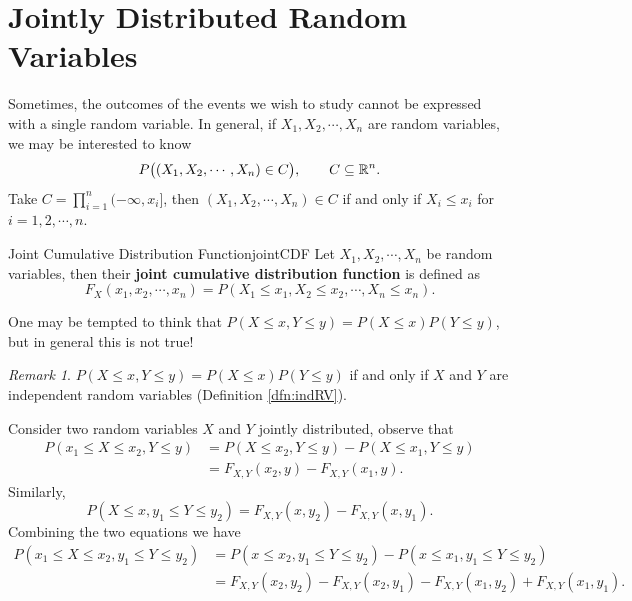 \documentclass[math]{amznotes}
\theoremstyle{remark}
\newtheorem*{remark}{Remark}
\newcommand{\0}{\mathbf{0}}
\newcommand{\1}{\mathbf{1}}
\begin{document}
\section{Jointly Distributed Random Variables}
Sometimes, the outcomes of the events we wish to study cannot be expressed with a single random variable. In general, if $X_1, X_2, \cdots, X_n$ are random variables, we may be interested to know
\begin{equation*}
    P\bigl((X_1, X_2, \cdots, X_n) \in C\bigr), \qquad C \subseteq \mathbb{R}^n.
\end{equation*}
Take $C = \prod_{i = 1}^{n}(-\infty, x_i]$, then $(X_1, X_2, \cdots, X_n) \in C$ if and only if $X_i \leq x_i$ for $i = 1, 2, \cdots, n$. 
\begin{dfnbox}{Joint Cumulative Distribution Function}{jointCDF}
    Let $X_1, X_2, \cdots, X_n$ be random variables, then their {\color{red} \textbf{joint cumulative distribution function}} is defined as
    \begin{equation*}
        F_{X}(x_1, x_2, \cdots, x_n) = P(X_1 \leq x_1, X_2 \leq x_2, \cdots, X_n \leq x_n).
    \end{equation*}
\end{dfnbox}
One may be tempted to think that $P(X \leq x, Y \leq y) = P(X \leq x)P(Y \leq y)$, but in general this is not true!
\begin{notebox}
    \begin{remark}
        $P(X \leq x, Y \leq y) = P(X \leq x)P(Y \leq y)$ if and only if $X$ and $Y$ are independent random variables (Definition \ref{dfn:indRV}).
    \end{remark}
\end{notebox}
Consider two random variables $X$ and $Y$ jointly distributed, observe that
\begin{align*}
    P(x_1 \leq X \leq x_2, Y \leq y) & = P(X \leq x_2, Y \leq y) - P(X \leq x_1, Y \leq y) \\
    & = F_{X, Y}(x_2, y) - F_{X, Y}(x_1, y).
\end{align*}
Similarly,
\begin{equation*}
    P(X \leq x, y_1 \leq Y \leq y_2) = F_{X, Y}(x, y_2) - F_{X, Y}(x, y_1).
\end{equation*}
Combining the two equations we have
\begin{align*}
    P(x_1 \leq X \leq x_2, y_1 \leq Y \leq y_2) & = P(x \leq x_2, y_1 \leq Y \leq y_2) - P(x \leq x_1, y_1 \leq Y \leq y_2) \\
    & = F_{X, Y}(x_2, y_2) - F_{X, Y}(x_2, y_1) - F_{X, Y}(x_1, y_2) + F_{X, Y}(x_1, y_1).
\end{align*}
\end{document}
